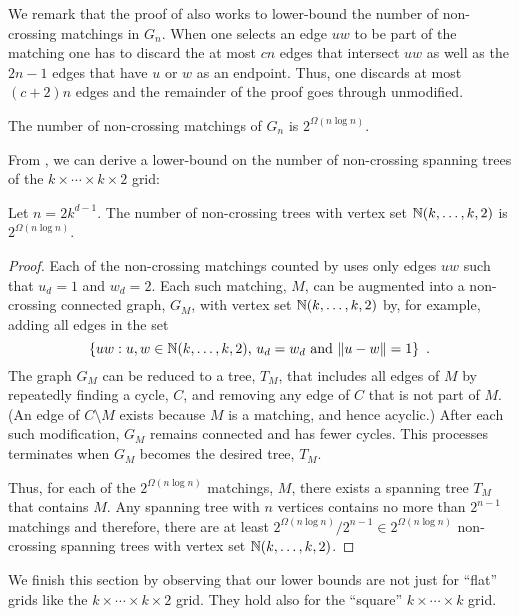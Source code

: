 \documentclass{patmorin}
\begin{document}
We remark that the proof of  also works to lower-bound
the number of non-crossing matchings in $G_n$.  When one selects an edge
$uw$ to be part of the matching one has to discard the at most $cn$
edges that intersect $uw$ as well as the $2n-1$ edges that have $u$
or $w$ as an endpoint.  Thus, one discards at most $(c+2)n$ edges and
the remainder of the proof goes through unmodified.

\begin{cor}
  The number of non-crossing matchings of $G_n$ is $2^{\Omega(n\log n)}$.
\end{cor}

From , we can derive a lower-bound on the number of
non-crossing spanning trees of the $k\times\cdots\times k\times 2$ grid:
\begin{cor}
  Let $n=2k^{d-1}$.  The number of non-crossing trees with vertex set
  $\mathbb{N}(k,\ldots,k,2)$ is $2^{\Omega(n\log n)}$.
\end{cor}

\begin{proof}
  Each of the non-crossing matchings counted by  uses
  only edges $uw$ such that $u_d=1$ and $w_d=2$.  Each such matching,
  $M$, can be augmented into a non-crossing connected graph, $G_M$,
  with vertex set $\mathbb{N}(k,\ldots,k,2)$ by, for example, adding all edges
  in the set
  \[
     \{ uw :\mbox{$u,w\in \mathbb{N}(k,\ldots,k,2)$, $u_d=w_d$ and $\|u-w\|=1$} \} \enspace .  
  \] 
  The graph $G_M$ can be reduced to a tree, $T_M$, that includes all edges
  of $M$ by repeatedly finding a cycle, $C$, and removing any edge of $C$
  that is not part of $M$.  (An edge of $C\setminus M$ exists because $M$
  is a matching, and hence acyclic.)  After each such modification, $G_M$
  remains connected and has fewer cycles.  This processes terminates
  when $G_M$ becomes the desired tree, $T_M$.

  Thus, for each of the $2^{\Omega(n\log n)}$ matchings, $M$, there
  exists a spanning tree $T_M$ that contains $M$.  Any spanning tree
  with $n$ vertices contains no more than $2^{n-1}$ matchings and therefore,
  there are at least $2^{\Omega(n\log n)}/2^{n-1}\in 2^{\Omega(n\log n)}$
  non-crossing spanning trees with vertex set $\mathbb{N}(k,\ldots,k,2)$.
\end{proof}

We finish this section by observing that our lower bounds are not
just for ``flat'' grids like the $k\times\cdots\times k\times 2$ grid.
They hold also for the ``square'' $k\times\cdots\times k$ grid.
\end{document}
